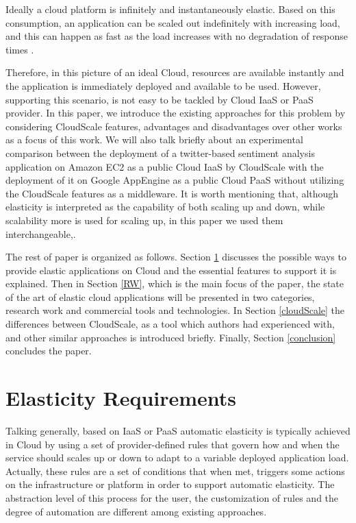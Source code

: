 \documentclass{sig-alternate}
\begin{document}
Ideally a cloud platform is infinitely and instantaneously elastic. Based on this consumption, an application can be scaled out indefinitely with increasing load, and this can happen as fast as the load increases with no degradation of response times \cite{brebner2012your}. 

Therefore, in this picture of an ideal Cloud, resources are available instantly and the application is immediately deployed and available to be used. However, supporting this scenario, is not easy to be tackled by Cloud IaaS or PaaS provider. In this paper, we introduce the existing approaches for this problem by considering CloudScale \cite{leitner2012cloudscale} features, advantages and disadvantages over other works as a focus of this work. We will also talk briefly about an experimental comparison between the deployment of a twitter-based sentiment analysis application on Amazon EC2 as a public Cloud IaaS by CloudScale with the deployment of it on Google AppEngine as a public Cloud PaaS without utilizing the CloudScale features as a middleware. It is worth mentioning that, although elasticity is interpreted as the capability of both scaling up and down, while scalability more is used for scaling up, in this paper we used them interchangeable,.

The rest of paper is organized as follows. Section \ref{elasticity-req} discusses the possible ways to provide elastic applications on Cloud and the essential features to support it is explained. Then in Section \ref{RW}, which is the main focus of the paper, the state of the art of elastic cloud applications will be presented in two categories, research work and commercial tools and technologies. In Section \ref{cloudScale} the differences between CloudScale, as a tool which authors had experienced with, and other similar approaches is introduced briefly. Finally, Section \ref{conclusion} concludes the paper.

\section{Elasticity Requirements} \label{elasticity-req}

Talking generally, based on \cite{vaquero2011dynamically} IaaS or PaaS automatic elasticity is typically achieved in Cloud by using a set of provider-defined rules that govern how and when the service should scales up or down to adapt to a variable deployed application load. Actually, these rules are a set of conditions that when met, triggers some actions on the infrastructure or platform in order to support automatic elasticity. The abstraction level of this process for the user, the customization of rules and the degree of automation are different among existing approaches.
\end{document}
